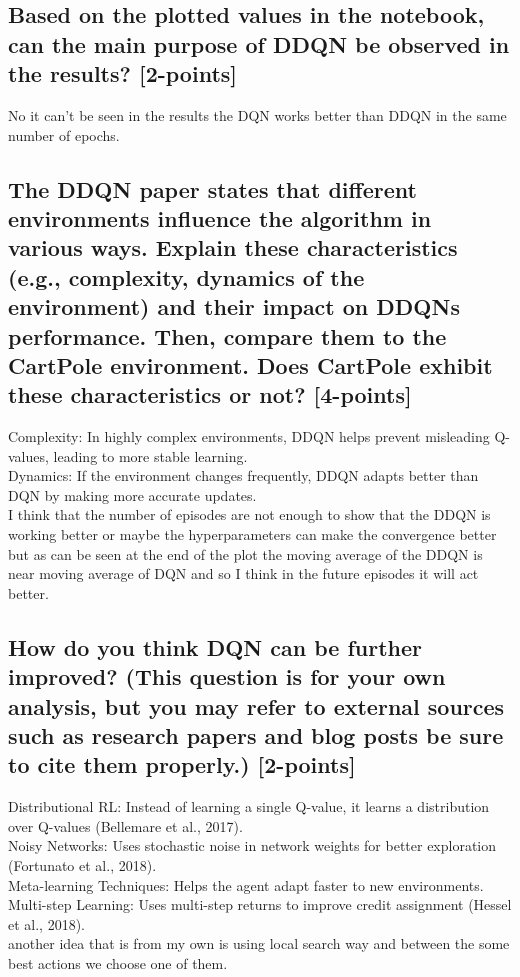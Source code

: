 \documentclass[12pt]{article}
\begin{document}
{{{				\subsection{Based on the plotted values in the notebook, can the main purpose of DDQN be observed in the
					results?
					[2-points]}
				No it can't be seen in the results the DQN works better than DDQN in the same number of epochs.
				\subsection{The DDQN paper states that different environments influence the algorithm in various ways. Explain
					these characteristics (e.g., complexity, dynamics of the environment) and their impact on DDQN\textquotesingle s performance. Then, compare them to the CartPole environment. Does CartPole exhibit these
					characteristics or not? [4-points]}
				Complexity: In highly complex environments, DDQN helps prevent misleading Q-values, leading to more stable learning.\\
				Dynamics: If the environment changes frequently, DDQN adapts better than DQN by making more accurate updates.\\
				I think that the number of episodes are not enough to show that the DDQN is working better or maybe the hyperparameters can make the convergence better but as can be seen at the end of the plot the moving average of the DDQN is near moving average of DQN and so I think in the future episodes it will act better.
				\subsection{How do you think DQN can be further improved? (This question is for your own analysis, but
					you may refer to external sources such as research papers and blog posts be sure to cite them
					properly.) [2-points]}
				Distributional RL: Instead of learning a single Q-value, it learns a distribution over Q-values (Bellemare et al., 2017).\\
				Noisy Networks: Uses stochastic noise in network weights for better exploration (Fortunato et al., 2018).\\
				Meta-learning Techniques: Helps the agent adapt faster to new environments.\\
				Multi-step Learning: Uses multi-step returns to improve credit assignment (Hessel et al., 2018).\\
				another idea that is from my own is using local search way and between the some best actions we choose one of them.
				
}}}
\end{document}
